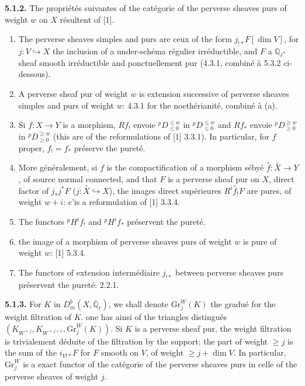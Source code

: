 \documentclass[12pt,a4paper]{article}
\theoremstyle{plain}
\theoremstyle{definition}
\newcommand{\into}{\hookrightarrow}
\begin{document}
{{\noindent\textbf{5.1.2.} The propri\'{e}t\'{e}s suivantes of the cat\'{e}gorie of the perverse sheaves purs of weight $w$ on $X$ r\'{e}sultent of [1].
\begin{enumerate}
\item[(a)] The perverse sheaves simples and purs are ceux of the form $j_{!*}F[\dim V]$, for $j: V \into X$ the inclusion of a under-sch\'{e}ma r\'{e}gulier irr\'{e}ductible, and $F$ a $\mathbb{Q}_{\ell}$-sheaf smooth irr\'{e}ductible and ponctuellement pur (4.3.1, combin\'{e} \`{a} 5.3.2 ci-dessous).
\item[(b)] A perverse sheaf pur of weight $w$ is extension successive of perverse sheaves simples and purs of weight $w$: 4.3.1 for the noeth\'{e}rianit\'{e}, combin\'{e} \`{a} (a).
\item[(c)] Si $f: X \to Y$ is a morphism, $Rf_{!}$ envoie ${}^{p}D^{\leq w}_{\leq 0}$ in ${}^{p}D^{\leq w}_{\leq 0}$ and $Rf_{*}$ envoie ${}^{p}D^{\geq w}_{\geq 0}$ in ${}^{p}D^{\geq w}_{\geq 0}$ (this are of the reformulations of [1] 3.3.1). In particular, for $f$ proper, $f_{!} = f_{*}$ pr\'{e}serve the puret\'{e}.
\item[(d)] More g\'{e}n\'{e}ralement, si $f$ is the compactification of a morphism s\'{e}by\'{e} $\overset{\circ}{f}: \overset{\circ}{X} \to Y$, of source normal connected, and that $F$ is a perverse sheaf pur on $X$, direct factor of $j_{*}j^{*}F$ ($j: \overset{\circ}{X} \into X$), the images direct sup\'{e}rieures $R^{i}\!\overset{\circ}{f}_{!}F$ are pures, of weight $w+i$: c'is a reformulation of [1] 3.3.4.
\item[(e)] The functors ${}^{p}H^{i}f_{!}$ and ${}^{p}H^{i}f_{*}$ pr\'{e}servent the puret\'{e}.
\item[(f)] the image of a morphism of perverse sheaves purs of weight $w$ is pure of weight $w$: [1] 5.3.4.
\item[(g)] The functors of extension interm\'{e}diaire $j_{!*}$ between perverse sheaves purs pr\'{e}servent the puret\'{e}: 2.2.1.
\end{enumerate}

\noindent\textbf{5.1.3.} For $K$ in $D_{m}^{b}(X, \overline{\mathbb{Q}}_{\ell})$, we shall denote $\mathrm{Gr}_{j}^{W}(K)$ the gradu\'{e} for the weight filtration of $K$. one has ainsi of the triangles distingu\'{e}s $(K_{W^{<j}}, K_{W^{<j+1}}, \mathrm{Gr}_{j}^{W}(K))$. Si $K$ is a perverse sheaf pur, the weight filtration is trivialement d\'{e}duite of the filtration by the support: the part of weight $\geq j$ is the sum of the $i_{V!*}F$ for $F$ smooth on $V$, of weight $\geq j + \dim V$. In particular, $\mathrm{Gr}_{j}^{W}$ is a exact functor of the cat\'{e}gorie of the perverse sheaves purs in celle of the perverse sheaves of weight $j$.

}}
\end{document}
